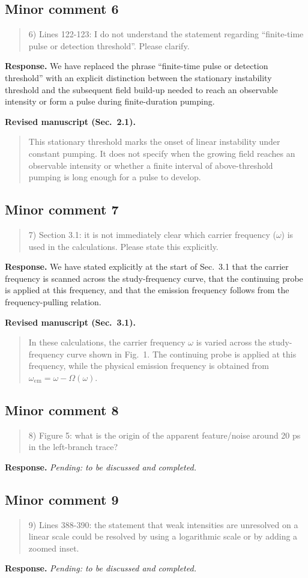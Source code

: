 \documentclass[11pt,a4paper]{article}
\newif\ifshowrevisions
\newcommand{\minorrevised}[1]{{\ifshowrevisions\color{revisiongreen}\fi #1}}
\newcommand{\reviewercomment}[1]{\begin{quote}\small #1\end{quote}}
\newcommand{\response}[1]{\par\textbf{Response.} #1\par}
\newcommand{\minormanuscripttext}[2]{\par\textbf{Revised manuscript (#1).}\begin{quote}\minorrevised{#2}\end{quote}}
\newcommand{\pendingresponse}{\response{\textit{Pending: to be discussed and completed.}}}
\begin{document}
\subsection*{Minor comment 6}
\label{r1-minor-6}
\reviewercomment{
6) Lines 122-123: I do not understand the statement regarding “finite-time pulse or detection threshold”. Please clarify.
}
\response{We have replaced the phrase ``finite-time pulse or detection threshold'' with an explicit distinction between the stationary instability threshold and the subsequent field build-up needed to reach an observable intensity or form a pulse during finite-duration pumping.}
\minormanuscripttext{Sec.~2.1}{This stationary threshold marks the onset of linear instability under constant pumping. It does not specify when the growing field reaches an observable intensity or whether a finite interval of above-threshold pumping is long enough for a pulse to develop.}


\subsection*{Minor comment 7}
\label{r1-minor-7}
\reviewercomment{
7) Section 3.1: it is not immediately clear which carrier frequency ($\omega$) is used in the calculations. Please state this explicitly.
}
\response{We have stated explicitly at the start of Sec.~3.1 that the carrier frequency is scanned across the study-frequency curve, that the continuing probe is applied at this frequency, and that the emission frequency follows from the frequency-pulling relation.}
\minormanuscripttext{Sec.~3.1}{In these calculations, the carrier frequency $\omega$ is varied across the study-frequency curve shown in Fig.~1. The continuing probe is applied at this frequency, while the physical emission frequency is obtained from $\omega_{\mathrm{em}}=\omega-\Omega(\omega)$.}


\subsection*{Minor comment 8}
\label{r1-minor-8}
\reviewercomment{
8) Figure 5: what is the origin of the apparent feature/noise around 20 ps in the left-branch trace?
}
\pendingresponse

\subsection*{Minor comment 9}
\label{r1-minor-9}
\reviewercomment{
9) Lines 388-390: the statement that weak intensities are unresolved on a linear scale could be resolved by using a logarithmic scale or by adding a zoomed inset.
}
\pendingresponse
\end{document}
